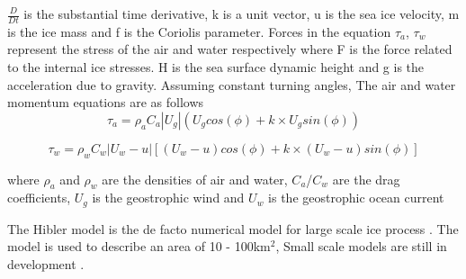 $\frac{D}{Dt}$ is the substantial time derivative, k is a unit vector, u is the sea ice velocity, m is the ice mass and f is the Coriolis parameter. Forces in the equation $\tau_a$, $\tau_w$ represent the stress of the air and water respectively where F is the force related to the internal ice stresses. H is the sea surface dynamic height and g is the acceleration due to gravity. Assuming constant turning angles, The air and water momentum equations are as follows
\begin{equation}
	\tau_a = \rho_a C_a|U_g|(U_g cos(\phi)+k\times U_g sin(\phi))
\end{equation}

\begin{equation}
	\tau_w = \rho_w C_w|U_w-u|[(U_w-u)cos(\phi)+k\times(U_w-u)sin(\phi)]
\end{equation}


where $\rho_a $ and $\rho_w$ are the densities of air and water, $C_a$/$C_w$ are the drag coefficients, $U_g$ is the geostrophic wind and $U_w$ is the geostrophic ocean current\par

The Hibler model is the de facto numerical model for large scale ice process \cite{Rutgher2019SmallScale}. The model is used to describe an area of 10 - 100km$^2$, Small scale models are still in development \cite{Rutgher2019SmallScale}.\par 

